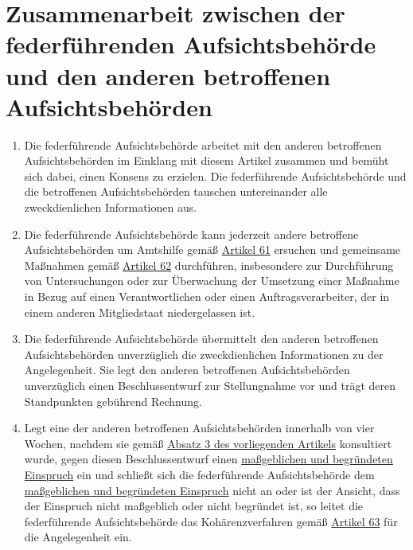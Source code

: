 \chapter{Zusammenarbeit zwischen der federführenden Aufsichtsbehörde und den anderen betroffenen Aufsichtsbehörden}
\label{ch:60}


\begin{enumerate}

  \item Die federführende Aufsichtsbehörde arbeitet mit den anderen betroffenen Aufsichtsbehörden im Einklang mit diesem
   Artikel zusammen und bemüht sich dabei, einen Konsens zu erzielen. Die federführende Aufsichtsbehörde und die
   betroffenen Aufsichtsbehörden tauschen untereinander alle zweckdienlichen Informationen aus.
  \label{itm:60-1}

  \item Die federführende Aufsichtsbehörde kann jederzeit andere betroffene Aufsichtsbehörden um Amtshilfe gemäß
  \hyperref[ch:61]{Artikel 61} ersuchen und gemeinsame Maßnahmen gemäß \hyperref[ch:62]{Artikel 62} durchführen,
   insbesondere zur Durchführung von Untersuchungen oder zur Überwachung der Umsetzung einer Maßnahme in Bezug auf
   einen Verantwortlichen oder einen Auftragsverarbeiter, der in einem anderen Mitgliedstaat niedergelassen ist.
  \label{itm:60-2}

  \item Die federführende Aufsichtsbehörde übermittelt den anderen betroffenen Aufsichtsbehörden unverzüglich die
   zweckdienlichen Informationen zu der Angelegenheit. Sie legt den anderen betroffenen Aufsichtsbehörden unverzüglich
   einen Beschlussentwurf zur Stellungnahme vor und trägt deren Standpunkten gebührend Rechnung.
  \label{itm:60-3}

  \item Legt eine der anderen betroffenen Aufsichtsbehörden innerhalb von vier Wochen, nachdem sie gemäß \hyperref
   [itm:60-3]{Absatz 3 des vorliegenden Artikels} konsultiert wurde, gegen diesen Beschlussentwurf einen \hyperref[itm:04-27]{maßgeblichen
   und begründeten Einspruch} ein und schließt sich die federführende Aufsichtsbehörde dem \hyperref[itm:04-27]{maßgeblichen und begründeten
   Einspruch} nicht an oder ist der Ansicht, dass der Einspruch nicht maßgeblich oder nicht begründet ist, so leitet die
   federführende Aufsichtsbehörde das Kohärenzverfahren gemäß \hyperref[ch:63]{Artikel 63} für die Angelegenheit ein.
  \label{itm:60-4}


\end{enumerate}
